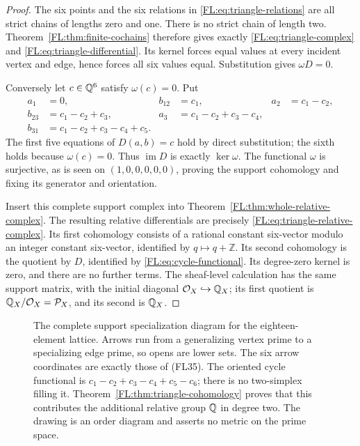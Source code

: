 \begin{proof}
The six points and the six relations in \eqref{FL:eq:triangle-relations}
are all strict chains of lengths zero and one. There is no strict
chain of length two. Theorem~\ref{FL:thm:finite-cochains} therefore gives
exactly \eqref{FL:eq:triangle-complex} and
\eqref{FL:eq:triangle-differential}. Its kernel forces equal values at
every incident vertex and edge, hence forces all six values equal.
Substitution gives $\omega D=0$.

Conversely let $c\in\mathbb Q^6$ satisfy $\omega(c)=0$. Put
\[
\begin{aligned}
 a_1&=0,& b_{12}&=c_1,& a_2&=c_1-c_2,\\
 b_{23}&=c_1-c_2+c_3,&a_3&=c_1-c_2+c_3-c_4,\\
 b_{31}&=c_1-c_2+c_3-c_4+c_5.
\end{aligned}
 \tag{FL39}\label{FL:eq:triangle-preimage}
\]
The first five equations of $D(a,b)=c$ hold by direct substitution;
the sixth holds because $\omega(c)=0$. Thus $\operatorname{im}D$
is exactly $\ker\omega$. The functional $\omega$ is surjective,
as is seen on $(1,0,0,0,0,0)$, proving the support cohomology and
fixing its generator and orientation.

Insert this complete support complex into
Theorem~\ref{FL:thm:whole-relative-complex}. The resulting relative
differentials are precisely \eqref{FL:eq:triangle-relative-complex}.
Its first cohomology consists of a rational constant six-vector
modulo an integer constant six-vector, identified by $q\mapsto q+\mathbb Z$.
Its second cohomology is the quotient by $D$, identified by
\eqref{FL:eq:cycle-functional}. Its degree-zero kernel is zero, and
there are no further terms. The sheaf-level calculation has the
same support matrix, with the initial diagonal
$\mathcal O_X\hookrightarrow\mathbb Q_X$; its first quotient is
$\mathbb Q_X/\mathcal O_X=\mathcal P_X$, and its second is $\mathbb Q_X$.
\end{proof}

\begin{figure}[ht]
\centering
{}
\caption{The complete support specialization diagram for the
eighteen-element lattice. Arrows run from a generalizing vertex prime
to a specializing edge prime, so opens are lower sets. The six arrow
coordinates are exactly those of (FL35). The oriented cycle functional
is $c_1-c_2+c_3-c_4+c_5-c_6$; there is no two-simplex filling it.
Theorem~\ref{FL:thm:triangle-cohomology} proves that this contributes
the additional relative group $\mathbb Q$ in degree two. The drawing is an
order diagram and asserts no metric on the prime space.}
\end{figure}

